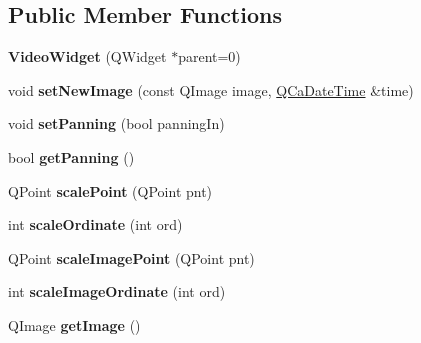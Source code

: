 \subsection*{Public Member Functions}
\begin{DoxyCompactItemize}
\item 
\hypertarget{classVideoWidget_a31e7897e4abd9733d45753e4a2e25882}{
{\bfseries VideoWidget} (QWidget $\ast$parent=0)}
\label{classVideoWidget_a31e7897e4abd9733d45753e4a2e25882}

\item 
\hypertarget{classVideoWidget_aef7791533c730a8a26db5a07cd9cb764}{
void {\bfseries setNewImage} (const QImage image, \hyperlink{classQCaDateTime}{QCaDateTime} \&time)}
\label{classVideoWidget_aef7791533c730a8a26db5a07cd9cb764}

\item 
\hypertarget{classVideoWidget_a62de3af677c82438720a9f1262c3179f}{
void {\bfseries setPanning} (bool panningIn)}
\label{classVideoWidget_a62de3af677c82438720a9f1262c3179f}

\item 
\hypertarget{classVideoWidget_a2bdd136e1ba5bef5089d3c23746874bf}{
bool {\bfseries getPanning} ()}
\label{classVideoWidget_a2bdd136e1ba5bef5089d3c23746874bf}

\item 
\hypertarget{classVideoWidget_a68d7ca969b84207508ad7399c43675b1}{
QPoint {\bfseries scalePoint} (QPoint pnt)}
\label{classVideoWidget_a68d7ca969b84207508ad7399c43675b1}

\item 
\hypertarget{classVideoWidget_a7372ef1a407b90d10a14e15099bf286d}{
int {\bfseries scaleOrdinate} (int ord)}
\label{classVideoWidget_a7372ef1a407b90d10a14e15099bf286d}

\item 
\hypertarget{classVideoWidget_a3afa88b0e1c2fc86f3f697e464a8b488}{
QPoint {\bfseries scaleImagePoint} (QPoint pnt)}
\label{classVideoWidget_a3afa88b0e1c2fc86f3f697e464a8b488}

\item 
\hypertarget{classVideoWidget_a806ed8629f1903a29e3ed4a93fe44566}{
int {\bfseries scaleImageOrdinate} (int ord)}
\label{classVideoWidget_a806ed8629f1903a29e3ed4a93fe44566}

\item 
\hypertarget{classVideoWidget_a9853fde90f4df168ba98f99ccb1a7bda}{
QImage {\bfseries getImage} ()}
\label{classVideoWidget_a9853fde90f4df168ba98f99ccb1a7bda}

\end{DoxyCompactItemize}
